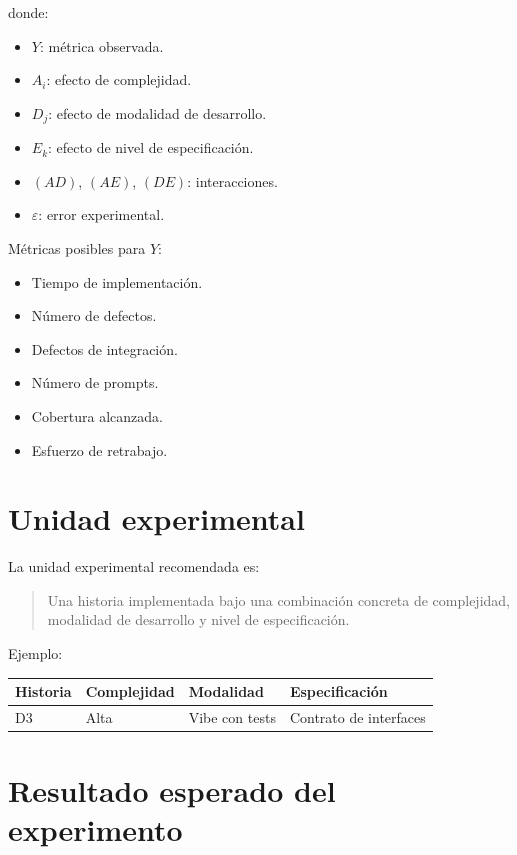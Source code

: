 \documentclass[11pt,a4paper]{article}
\begin{document}
donde:

\begin{itemize}[leftmargin=*]
    \item $Y$: m\'etrica observada.
    \item $A_i$: efecto de complejidad.
    \item $D_j$: efecto de modalidad de desarrollo.
    \item $E_k$: efecto de nivel de especificaci\'on.
    \item $(AD)$, $(AE)$, $(DE)$: interacciones.
    \item $\varepsilon$: error experimental.
\end{itemize}

M\'etricas posibles para $Y$:

\begin{itemize}[leftmargin=*]
    \item Tiempo de implementaci\'on.
    \item N\'umero de defectos.
    \item Defectos de integraci\'on.
    \item N\'umero de prompts.
    \item Cobertura alcanzada.
    \item Esfuerzo de retrabajo.
\end{itemize}

\section{Unidad experimental}

La unidad experimental recomendada es:

\begin{quote}
Una historia implementada bajo una combinaci\'on concreta de complejidad, modalidad de desarrollo y nivel de especificaci\'on.
\end{quote}

Ejemplo:

\begin{table}[h!]
\centering
\begin{tabular}{llll}
\toprule
\textbf{Historia} & \textbf{Complejidad} & \textbf{Modalidad} & \textbf{Especificaci\'on} \\
\midrule
D3 & Alta & Vibe con tests & Contrato de interfaces \\
\bottomrule
\end{tabular}
\end{table}

\section{Resultado esperado del experimento}
\end{document}
